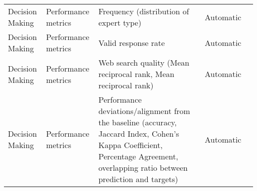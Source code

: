 \begin{small}
\begin{center}
\begin{longtable}{@{}p{}p{}p{}p{}p{}@{}}
Decision Making          & Performance metrics                 & Frequency (distribution of expert type)                                                                                                                                                                     & Automatic & \cite{Wang2024DEEMDE}                                                                                                                                                                                                                                                                                                                                                                                     \\
Decision Making          & Performance metrics                 & Valid response rate                                                                                                                                                                                         & Automatic & \cite{Xie2024CanLL}                                                                                                                                                                                                                                                                                                                                                                                                      \\
Decision Making          & Performance metrics                 & Web search quality (Mean reciprocal rank, Mean reciprocal rank)                                                                                                                                             & Automatic & \cite{Ren2024BASESLW}                                                                                                                                                                                                                                                                                                                                                                                 \\
Decision Making          & Performance metrics                 & Performance deviations/alignment from the baseline (accuracy, Jaccard Index, Cohen’s Kappa Coefficient, Percentage Agreement, overlapping ratio between prediction and targets)                             & Automatic & \cite{Kim2024WillLS}                                                                                                                                                                                                                                                                                                                                                                               \\

\end{longtable}
\end{center}
\end{small}
